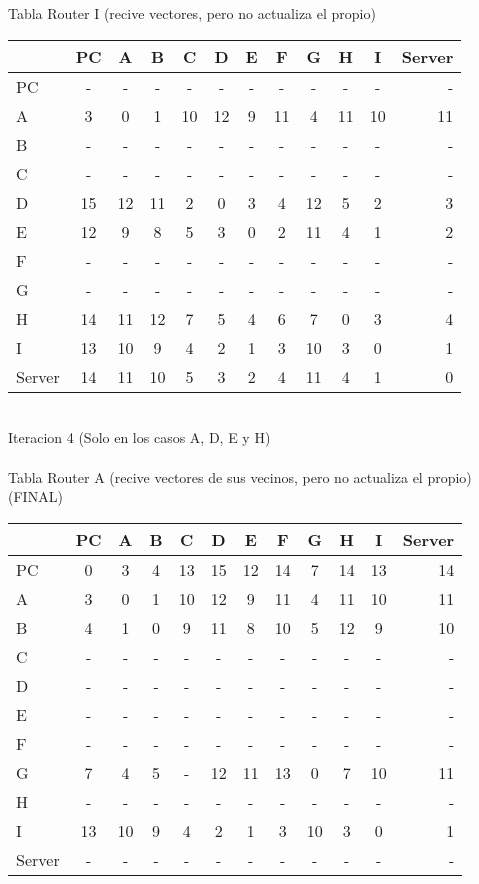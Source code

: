 \documentclass{article}
\begin{document}
\\
\\
Tabla Router I (recive vectores, pero no actualiza el propio)\\
\begin{tabular}{l*{10}{c}r}
              & PC & A & B & C & D & E & F & G & H & I & Server \\
\hline
PC             & - & - & - & - & - & - & - & - & - & - & -\\
A              & 3 & 0 & 1 & 10 & 12 & 9 & 11 & 4 & 11 & 10 & 11 \\
B              & - & - & - & - & - & - & - & - & - & - & -\\
C              & - & - & - & - & - & - & - & - & - & - & -\\
D              & 15 & 12 & 11 & 2 & 0 & 3 & 4 & 12 & 5 & 2 & 3\\
E              & 12 & 9 & 8 & 5 & 3 & 0 & 2 & 11 & 4 & 1 & 2\\
F              & - & - & - & - & - & - & - & - & - & - & -\\
G              & - & - & - & - & - & - & - & - & - & - & -\\
H              & 14 & 11 & 12 & 7 & 5 & 4 & 6 & 7 & 0 & 3 & 4\\
I              & 13 & 10 & 9 & 4 & 2 & 1 & 3 & 10 & 3 & 0 & 1\\
Server         & 14 & 11 & 10 & 5 & 3 & 2 & 4 & 11 & 4 & 1 & 0\\

\end{tabular}
\\
Iteracion 4 (Solo en los casos A, D, E y H)
\\
\\
Tabla Router A (recive vectores de sus vecinos, pero no actualiza el propio) (FINAL)\\
\begin{tabular}{l*{10}{c}r}
              & PC & A & B & C & D & E & F & G & H & I & Server \\
\hline
PC             & 0 & 3 & 4 & 13& 15& 12& 14	 & 7 & 14 & 13 & 14\\
A              & 3 & 0 & 1 & 10 & 12 & 9 & 11 & 4 & 11 & 10 & 11 \\
B              & 4 & 1 & 0 & 9 & 11	& 8 & 10 & 5 & 12 & 9 & 10\\
C              & - & - & - & - & - & - & - & - & - & - & -\\
D              & - & - & - & - & - & - & - & - & - & - & -\\
E              & - & - & - & - & - & - & - & - & - & - & -\\
F              & - & - & - & - & - & - & - & - & - & - & -\\
G              & 7 & 4 & 5 & - & 12 & 11 & 13 & 0 & 7 & 10 & 11\\
H              & - & - & - & - & - & - & - & - & - & - & -\\
I              & 13 & 10 & 9 & 4 & 2 & 1 & 3 & 10 & 3 & 0 & 1\\
Server         & - & - & - & - & - & - & - & - & - & - & -\\

\end{tabular}
\end{document}
